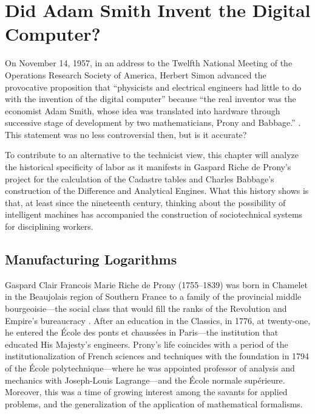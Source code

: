 \documentclass[version=last,draft=false,paper=A4,portrait,twoside=true,twocolumn=false,headinclude=false,footinclude=false,fontsize=12,BCOR=20mm,DIV=calc,pagesize=auto,titlepage=firstiscover,mpinclude=false,open=right,chapterprefix=true,numbers=autoendperiod,headsepline=false,headings=twolinechapter,parskip=false]{scrbook}
\begin{document}
\chapter{Did Adam Smith Invent the Digital Computer?}
\label{sec:org60e0f0d}

On November 14, 1957, in an address to the Twelfth National Meeting of the
Operations Research Society of America, Herbert Simon advanced the
provocative proposition that ``physicists and electrical engineers had
little to do with the invention of the digital computer'' because ``the
real inventor was the economist Adam Smith, whose idea was translated into
hardware through successive stage of development by two mathematicians,
Prony and Babbage.'' \autocite[2]{simon_newell1958}. This statement was
no less controversial then, but is it accurate?

To contribute to an alternative to the technicist view, this chapter will
analyze the historical specificity of labor as it manifests in Gaspard
Riche de Prony's project for the calculation of the Cadastre tables and
Charles Babbage's construction of the Difference and Analytical Engines.
What this history shows is that, at least since the nineteenth century,
thinking about the possibility of intelligent machines has accompanied the
construction of sociotechnical systems for disciplining workers. 

\section{Manufacturing Logarithms}
\label{sec:org1c90d43}
Gaspard Clair Francois Marie Riche de Prony (1755--1839) was born in
Chamelet in the Beaujolais region of Southern France to a family of the
provincial middle bourgeoisie---the social class that would fill the ranks
of the Revolution and Empire's bureaucracy \autocite{picon_et_al1984}. After
an education in the Classics, in 1776, at twenty-one, he entered the École
des ponts et chaussées in Paris---the institution that educated His
Majesty's engineers. Prony's life coincides with a period of the
institutionalization of French sciences and techniques with the foundation
in 1794 of the École polytechnique---where he was appointed professor of
analysis and mechanics with Joseph-Louis Lagrange---and the École normale
supérieure. Moreover, this was a time of growing interest among the savants
for applied problems, and the generalization of the application of
mathematical formalisms.
\end{document}
